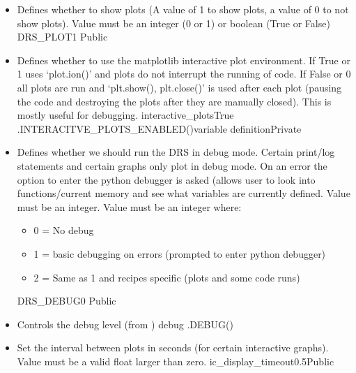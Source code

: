 \begin{itemize}
\item {} 
{Defines whether to show plots (A value of 1 to show plots, a value of 0 to not show plots). Value must be an integer (0 or 1) or boolean (True or False)}
{DRS\_PLOT}{1}
{\AllRecipes}{\configtxtfile}{\AllRecipes}{Public}

\ifdevguide
\item {}
{Defines whether to use the matplotlib interactive plot environment. If True or 1 uses `plot.ion()' and plots do not interrupt the running of code. If False or 0 all plots are run and `plt.show(), plt.close()' is used after each plot (pausing the code and destroying the plots after they are manually closed). This is mostly useful for debugging.}
{interactive\_plots}{True}
{\spirouPlot}{\spirouConst.INTERACITVE\_PLOTS\_ENABLED()}{\spirouPlot variable definition}{Private}
\fi

\item {} 
{Defines whether we should run the DRS in debug mode. Certain print/log statements and certain graphs only plot in debug mode. On an error the option to enter the python debugger is asked (allows user to look into functions/current memory and see what variables are currently defined. Value must be an integer. Value must be an integer where:
\begin{itemize}
\item 0 = No debug
\item 1 = basic debugging on errors (prompted to enter python debugger)
\item 2 = Same as 1 and recipes specific (plots and some code runs)
\end{itemize}
}
{DRS\_DEBUG}{0}
{\AllRecipes}{\configtxtfile}{\AllRecipes}{Public}

\ifdevguide
\item {}
{Controls the debug level (from )}
{debug}
{\AllRecipes}{\spirouConst.DEBUG()}{\AllRecipes}
\fi

\item {}
{Set the interval between plots in seconds (for certain interactive graphs). Value must be a valid float larger than zero.}
{ic\_display\_timeout}{0.5}{\callocRAW}{\constantsfile}{}{Public}

\end{itemize}






